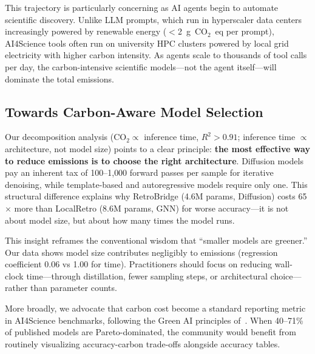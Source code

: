 \documentclass{article}
\theoremstyle{plain}
\theoremstyle{definition}
\theoremstyle{remark}
\begin{document}
This trajectory is particularly concerning as AI agents begin to automate scientific discovery. Unlike LLM prompts, which run in hyperscaler data centers increasingly powered by renewable energy ($<$2~g~CO$_2$~eq per prompt), AI4Science tools often run on university HPC clusters powered by local grid electricity with higher carbon intensity. As agents scale to thousands of tool calls per day, the carbon-intensive scientific models---not the agent itself---will dominate the total emissions.

\subsection{Towards Carbon-Aware Model Selection}

Our decomposition analysis (CO$_2 \propto$ inference time, $R^2 > 0.91$; inference time $\propto$ architecture, not model size) points to a clear principle: \textbf{the most effective way to reduce emissions is to choose the right architecture}. Diffusion models pay an inherent tax of 100--1{,}000 forward passes per sample for iterative denoising, while template-based and autoregressive models require only one. This structural difference explains why RetroBridge (4.6M params, Diffusion) costs 65$\times$ more than LocalRetro (8.6M params, GNN) for worse accuracy---it is not about model size, but about how many times the model runs.

This insight reframes the conventional wisdom that ``smaller models are greener.'' Our data shows model size contributes negligibly to emissions (regression coefficient 0.06 vs 1.00 for time). Practitioners should focus on reducing wall-clock time---through distillation, fewer sampling steps, or architectural choice---rather than parameter counts.

More broadly, we advocate that carbon cost become a standard reporting metric in AI4Science benchmarks, following the Green AI principles of~\citet{schwartz2020green}. When 40--71\% of published models are Pareto-dominated, the community would benefit from routinely visualizing accuracy-carbon trade-offs alongside accuracy tables.

\end{document}
